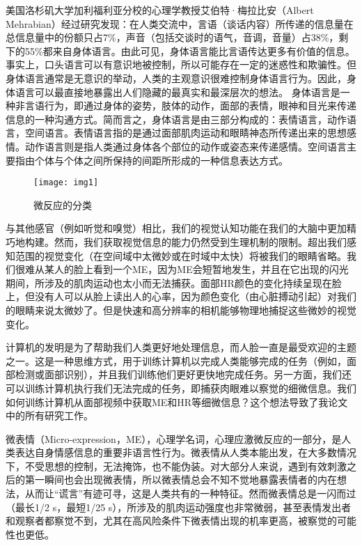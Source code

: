 美国洛杉矶大学加利福利亚分校的心理学教授艾伯特·梅拉比安（Albert Mehrabian）经过研究发现：在人类交流中，言语（谈话内容）所传递的信息量在总信息量中的份额只占7\%，声音（包括交谈时的语气，音调，音量）占38\%，剩下的55\%都来自身体语言。由此可见，身体语言能比言语传达更多有价值的信息。事实上，口头语言可以有意识地被控制，所以可能存在一定的迷惑性和欺骗性。但身体语言通常是无意识的举动，人类的主观意识很难控制身体语言行为。因此，身体语言可以最直接地暴露出人们隐藏的最真实和最深层次的想法。
身体语言是一种非言语行为，即通过身体的姿势，肢体的动作，面部的表情，眼神和目光来传递信息的一种沟通方式。简而言之，身体语言是由三部分构成的：表情语言，动作语言，空间语言。表情语言指的是通过面部肌肉运动和眼睛神态所传递出来的思想感情。动作语言则是指人类通过身体各个部位的动作或姿态来传递感情。空间语言主要指由个体与个体之间所保持的间距所形成的一种信息表达方式。
\begin{figure}[!htbp]
    \centering
    \texttt{[image: img1]}
    \caption{ 微反应的分类}
    \label{fig:img2}
\end{figure}

与其他感官（例如听觉和嗅觉）相比，我们的视觉认知功能在我们的大脑中更加精巧地构建。然而，我们获取视觉信息的能力仍然受到生理机制的限制。超出我们感知范围的视觉变化（在空间域中太微妙或在时域中太快）将被我们的眼睛省略。我们很难从某人的脸上看到一个ME，因为ME会短暂地发生，并且在它出现的闪光期间，所涉及的肌肉运动也太小而无法捕获。面部HR颜色的变化持续呈现在脸上，但没有人可以从脸上读出人的心率，因为颜色变化（由心脏搏动引起）对我们的眼睛来说太微妙了。但是快速和高分辨率的相机能够物理地捕捉这些微妙的视觉变化。

计算机的发明是为了帮助我们人类更好地处理信息，而人脸一直是最受欢迎的主题之一。这是一种思维方式，用于训练计算机以完成人类能够完成的任务（例如，面部检测或面部识别），并且我们训练他们更好更快地完成任务。另一方面，我们还可以训练计算机执行我们无法完成的任务，即捕获肉眼难以察觉的细微信息。我们如何训练计算机从面部视频中获取ME和HR等细微信息？这个想法导致了我论文中的所有研究工作。

微表情（Micro-expression，ME），心理学名词，心理应激微反应的一部分，是人类表达自身情感信息的重要非语言性行为。微表情从人类本能出发，在大多数情况下，不受思想的控制，无法掩饰，也不能伪装。对大部分人来说，遇到有效刺激之后的第一瞬间也会出现微表情，所以微表情总会不知不觉地暴露表情者的内在想法，从而让“谎言”有迹可寻，这是人类共有的一种特征。然而微表情总是一闪而过（最长1/2 s，最短1/25 s），所涉及的肌肉运动强度也非常微弱，甚至表情发出者和观察者都察觉不到，尤其在高风险条件下微表情出现的机率更高，被察觉的可能性也更低。

